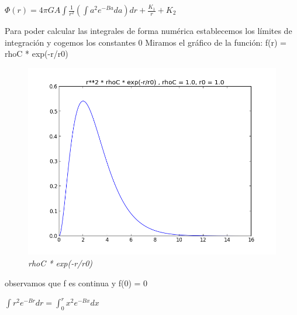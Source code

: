 \documentclass[12pt]{book}
\begin{document}
\begin{description}
\item $\Phi(r) = 4 \pi G A \int{ \frac{1}{r^2}(\int{a^2 e^{-Ba}da})dr} + \frac{K_1}{r} + K_2$



\item Para poder calcular las integrales de forma numérica establecemos los límites de integración y cogemos los constantes 0
Miramos el gráfico de la función: f(r) = rhoC * exp(-r/r0)
\begin{figure}[!ht]
 \centering
 \includegraphics[scale=0.33]{func1Plot.png}
 \caption{\emph{rhoC * exp(-r/r0)}}
\end{figure}
observamos que  f es  continua y f(0) = 0
\item  $\int{r^2 e^{-Br}dr} = \int_0^r{x^2 e^{-Bx}dx}$



\end{description}
\end{document}
